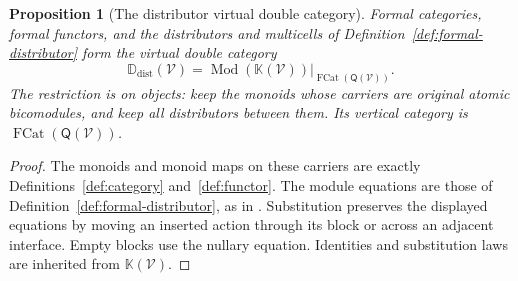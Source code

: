 \documentclass[11pt,a4paper]{article}
\newtheorem{proposition}[theorem]{Proposition}
\theoremstyle{definition}
\theoremstyle{remark}
\numberwithin{equation}{section}
\newcommand{\V}{\mathcal V}
\newcommand{\Kcal}{\mathbb K}
\newcommand{\Q}{\mathsf Q}
\newcommand{\Mod}{\operatorname{Mod}}
\newcommand{\FCat}{\operatorname{FCat}}
\newcommand{\Ddist}{\mathbb D_{\mathrm{dist}}}
\begin{document}
\begin{proposition}[The distributor virtual double category]\label{prop:distributor-vdc}
Formal categories, formal functors, and the distributors and multicells
of Definition~\ref{def:formal-distributor} form the virtual double category
\[
\Ddist(\V)=
\left.\Mod(\Kcal(\V))\right|_{\FCat(\Q(\V))}.
\]
The restriction is on objects: keep the monoids whose carriers are
original atomic bicomodules, and keep all distributors between them.
Its vertical category is $\FCat(\Q(\V))$.
\end{proposition}
\begin{proof}
The monoids and monoid maps on these carriers are exactly
Definitions~\ref{def:category} and~\ref{def:functor}. The module equations
are those of Definition~\ref{def:formal-distributor}, as in
\cite[Definition 2.8]{CS}. Substitution preserves the displayed equations by moving an inserted
action through its block or across an adjacent interface. Empty blocks
use the nullary equation. Identities and substitution laws are
inherited from $\Kcal(\V)$.
\end{proof}
\end{document}
